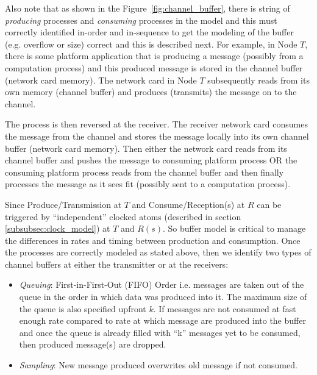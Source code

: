 Also note that as shown in the Figure~\ref{fig:channel_buffer}, there is string of \emph{producing} processes and \emph{consuming} processes in the model and this must correctly identified in-order and in-sequence to get the modeling of the buffer (e.g. overflow or size) correct and this is described next. For example, in Node $T$, there is some platform application that is producing a message (possibly from a computation process) and this produced message is stored in the channel buffer (network card memory). The network card in Node $T$ subsequently reads from its own memory (channel buffer) and produces (transmits) the message on to the channel. 

The process is then reversed at the receiver. The receiver network card consumes the message from the channel and stores the message locally into its own channel buffer (network card memory). Then either the network card reads from its channel buffer and pushes the message to consuming platform process OR the consuming platform process reads from the channel buffer and then finally processes the message as it sees fit (possibly sent to a computation process).

Since Produce/Transmission at $T$ and Consume/Reception(s) at $R$ can be triggered by “independent” clocked atoms (described in section \ref{subsubsec:clock_model}) at $T$ and $R(s)$. So buffer model is critical to manage the differences in rates and timing between production and consumption. Once the processes are correctly modeled as stated above, then we identify two types of channel buffers at either the transmitter or at the receivers:
\begin{itemize}
\item \emph{Queuing}: First-in-First-Out (FIFO) Order i.e. messages are taken out of the queue in the order in which data was produced into it.  The maximum size of the queue is also specified upfront $k$. If messages are not consumed at fast enough rate compared to rate at which message are produced into the buffer and once the queue is already filled with   “k” messages yet to be consumed, then produced message(s) are dropped. 

\item \emph{Sampling}: New message produced overwrites old message if not consumed.

\end{itemize}


